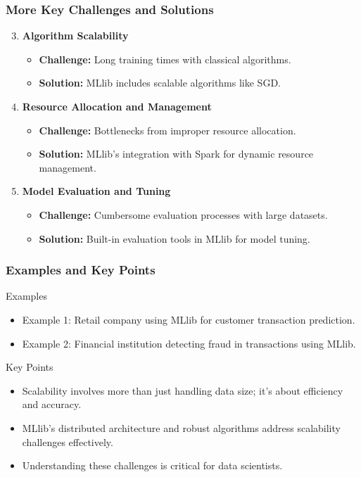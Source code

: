 \documentclass[aspectratio=169]{beamer}
\begin{document}
\begin{frame}[fragile]
    \frametitle{More Key Challenges and Solutions}
    \begin{enumerate}
        \setcounter{enumi}{2}
        \item \textbf{Algorithm Scalability}
            \begin{itemize}
                \item \textbf{Challenge:} Long training times with classical algorithms.
                \item \textbf{Solution:} MLlib includes scalable algorithms like SGD.
            \end{itemize}

        \item \textbf{Resource Allocation and Management}
            \begin{itemize}
                \item \textbf{Challenge:} Bottlenecks from improper resource allocation.
                \item \textbf{Solution:} MLlib's integration with Spark for dynamic resource management.
            \end{itemize}
        
        \item \textbf{Model Evaluation and Tuning}
            \begin{itemize}
                \item \textbf{Challenge:} Cumbersome evaluation processes with large datasets.
                \item \textbf{Solution:} Built-in evaluation tools in MLlib for model tuning.
            \end{itemize}
    \end{enumerate}
\end{frame}

\begin{frame}[fragile]
    \frametitle{Examples and Key Points}
    \begin{block}{Examples}
        \begin{itemize}
            \item Example 1: Retail company using MLlib for customer transaction prediction.
            \item Example 2: Financial institution detecting fraud in transactions using MLlib.
        \end{itemize}
    \end{block}
    
    \begin{block}{Key Points}
        \begin{itemize}
            \item Scalability involves more than just handling data size; it's about efficiency and accuracy.
            \item MLlib's distributed architecture and robust algorithms address scalability challenges effectively.
            \item Understanding these challenges is critical for data scientists.
        \end{itemize}
    \end{block}
\end{frame}
\end{document}
